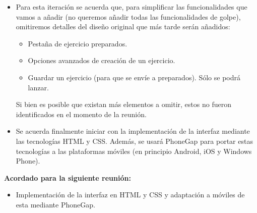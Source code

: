 \begin{itemize}
\item Para esta iteración se acuerda que, para simplificar las funcionalidades que vamos a añadir (no queremos añadir todas las funcionalidades de golpe), omitiremos detalles del diseño original que más tarde serán añadidos:
\begin{itemize}
	\item Pestaña de ejercicio preparados.
	\item Opciones avanzados de creación de un ejercicio.
	\item Guardar un ejercicio (para que se envíe a preparados). Sólo se podrá lanzar.
\end{itemize}
Si bien es posible que existan más elementos a omitir, estos no fueron identificados en el momento de la reunión.

\item Se acuerda finalmente iniciar con la implementación de la interfaz mediante las tecnologías HTML y CSS. Además, se usará PhoneGap para portar estas tecnologías a las plataformas móviles (en principio Android, iOS y Windows Phone).
\end{itemize}

\textbf{Acordado para la siguiente reunión:}

\begin{itemize}
\item Implementación de la interfaz en HTML y CSS y adaptación a móviles de esta mediante PhoneGap.
\end{itemize}
